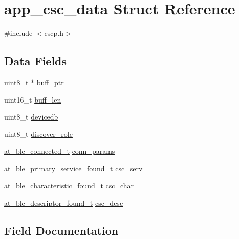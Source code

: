 \hypertarget{structapp__csc__data}{}\section{app\+\_\+csc\+\_\+data Struct Reference}
\label{structapp__csc__data}


{\ttfamily \#include $<$cscp.\+h$>$}

\subsection*{Data Fields}
\begin{DoxyCompactItemize}
\item 
uint8\+\_\+t $\ast$ \mbox{\hyperlink{structapp__csc__data_af34165e5e67e8fa1a840bcbe1e2bff0f}{buff\+\_\+ptr}}
\item 
uint16\+\_\+t \mbox{\hyperlink{structapp__csc__data_aba5e91d7ba5d949434cddb6f6cf1db80}{buff\+\_\+len}}
\item 
uint8\+\_\+t \mbox{\hyperlink{structapp__csc__data_a0716913078c455c07a8a36037650970e}{devicedb}}
\item 
uint8\+\_\+t \mbox{\hyperlink{structapp__csc__data_a6bbd9c0dd5adcc10a45804682b4a2fb5}{discover\+\_\+role}}
\item 
\mbox{\hyperlink{structat__ble__connected__t}{at\+\_\+ble\+\_\+connected\+\_\+t}} \mbox{\hyperlink{structapp__csc__data_aa63ebe8c9ed55c19dbcfc3ea5c572e27}{conn\+\_\+params}}
\item 
\mbox{\hyperlink{structat__ble__primary__service__found__t}{at\+\_\+ble\+\_\+primary\+\_\+service\+\_\+found\+\_\+t}} \mbox{\hyperlink{structapp__csc__data_a64fd0cf7fe67381aafa1049e81962863}{csc\+\_\+serv}}
\item 
\mbox{\hyperlink{structat__ble__characteristic__found__t}{at\+\_\+ble\+\_\+characteristic\+\_\+found\+\_\+t}} \mbox{\hyperlink{structapp__csc__data_a9f076867f147ef3d4d36e80d808e6ae3}{csc\+\_\+char}}
\item 
\mbox{\hyperlink{structat__ble__descriptor__found__t}{at\+\_\+ble\+\_\+descriptor\+\_\+found\+\_\+t}} \mbox{\hyperlink{structapp__csc__data_ad7d9b912938d426e90e5054b4daace93}{csc\+\_\+desc}}
\end{DoxyCompactItemize}


\subsection{Field Documentation}
\mbox{\label{structapp__csc__data_aba5e91d7ba5d949434cddb6f6cf1db80}} 
